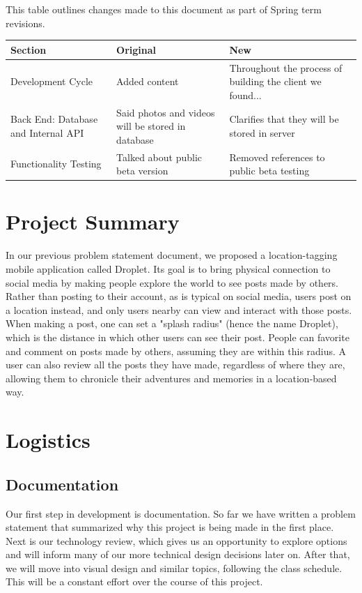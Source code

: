 \documentclass[draftclsnofoot, onecolumn,journal,letterpaper,10pt, compsoc]{IEEEtran}
\begin{document}
This table outlines changes made to this document as part of Spring term revisions. \\

\begin{tabularx}{\columnwidth}{X|X|X}
\textbf{Section} & \textbf{Original} & \textbf{New} \\ 
\hline

Development Cycle & 
Added content & 
Throughout the process of building the client we found... \\
\hline
Back End: Database and Internal API &
Said photos and videos will be stored in database &
Clarifies that they will be stored in server
\\ \hline

Functionality Testing & 
Talked about public beta version & 
Removed references to public beta testing \\
\hline

\end{tabularx}


\pagebreak

\section{Project Summary}

In our previous problem statement document, we proposed a location-tagging mobile application called Droplet. Its goal is to bring physical connection to social media by making people explore the world to see posts made by others. Rather than posting to their account, as is typical on social media, users post on a location instead, and only users nearby can view and interact with those posts. When making a post, one can set a "splash radius" (hence the name Droplet), which is the distance in which other users can see their post. People can favorite and comment on posts made by others, assuming they are within this radius. A user can also review all the posts they have made, regardless of where they are, allowing them to chronicle their adventures and memories in a location-based way. 

\section{Logistics}

\subsection{Documentation}
Our first step in development is documentation. So far we have written a problem statement that summarized why this project is being made in the first place. Next is our technology review, which gives us an opportunity to explore options and will inform many of our more technical design decisions later on. After that, we will move into visual design and similar topics, following the class schedule. This will be a constant effort over the course of this project.
\end{document}
